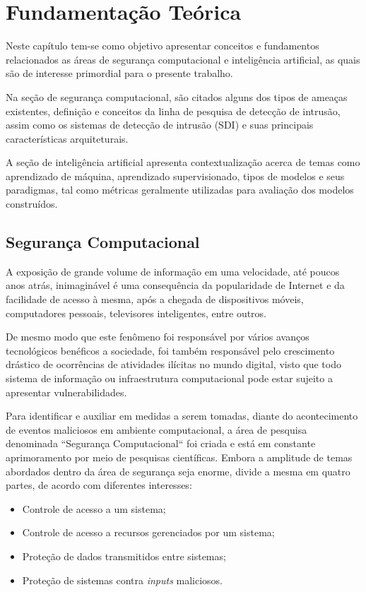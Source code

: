 \chapter{Fundamentação Teórica}
\label{Cap:fundamentacao}

Neste capítulo tem-se como objetivo apresentar conceitos e fundamentos relacionados as áreas de segurança computacional e inteligência artificial, as quais são de interesse primordial para o presente trabalho.

Na seção de segurança computacional, são citados alguns dos tipos de ameaças existentes, definição e conceitos da linha de pesquisa de detecção de intrusão, assim como os sistemas de detecção de intrusão (SDI) e suas principais características arquiteturais.

A seção de inteligência artificial apresenta contextualização acerca de temas como aprendizado de máquina, aprendizado supervisionado, tipos de modelos e seus paradigmas, tal como métricas geralmente utilizadas para avaliação dos modelos construídos.

\section{Segurança Computacional}
\label{Sec:seguranca-computacional}
A exposição de grande volume de informação em uma velocidade, até poucos anos atrás, inimaginável é uma consequência da popularidade de Internet e da facilidade de acesso à mesma, após a chegada de dispositivos móveis, computadores pessoais, televisores inteligentes, entre outros.

De mesmo modo que este fenômeno foi responsável por vários avanços tecnológicos benéficos a sociedade, foi também responsável pelo crescimento drástico de ocorrências de atividades ilícitas no mundo digital, visto que todo sistema de informação ou infraestrutura computacional pode estar sujeito a apresentar vulnerabilidades.

Para identificar e auxiliar em medidas a serem tomadas, diante do acontecimento de eventos maliciosos em ambiente computacional, a área de pesquisa denominada ``Segurança Computacional`` foi criada e está em constante aprimoramento por meio de pesquisas científicas. Embora a amplitude de temas abordados dentro da área de segurança seja enorme,  divide a mesma em quatro partes, de acordo com diferentes interesses:

\begin{itemize}
    \item Controle de acesso a um sistema;
    \item Controle de acesso a recursos gerenciados por um sistema;
    \item Proteção de dados transmitidos entre sistemas;
    \item Proteção de sistemas contra \textit{inputs} maliciosos.
\end{itemize}

